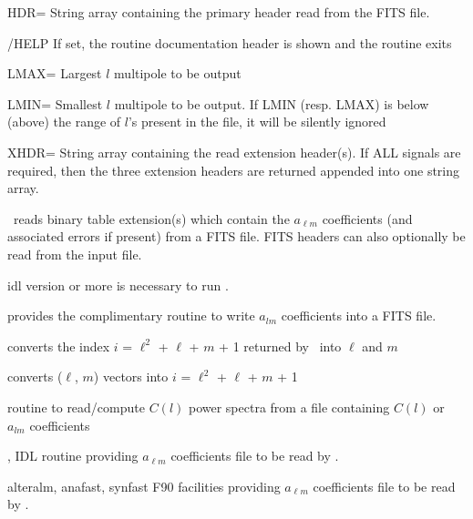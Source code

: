 \begin{keywords}
  \begin{kwlist}{} %
    \item[HDR=] String array containing the primary header read from the FITS
      file. 
    \item[/HELP] If set, the routine documentation header is shown and the routine exits	
    \item[LMAX=] Largest $l$ multipole  to be output
    \item[LMIN=] Smallest $l$ multipole to be output. If LMIN (resp. LMAX) is below (above) the range of $l$'s present in the file,
              it will be silently ignored
    \item[XHDR=] String array containing the read extension header(s). If
                  ALL signals are required, then the three extension 
                  headers are returned appended into one string array.
  \end{kwlist}
\end{keywords}  

\begin{codedescription}
{\thedocid\ reads binary table extension(s) 
which contain the $a_{\ell m}$ coefficients (and associated errors if present)
from a FITS file. FITS headers can also optionally be read from the 
input file. 
}
\end{codedescription}



\begin{related}
  \begin{sulist}{} %
    \item[idl] version \idlversion or more is necessary to run \thedocid.
    \item[\htmlref{alm2fits}{idl:alm2fits}] provides the complimentary routine to write
      $a_{lm}$ coefficients into a FITS file.
    \item[\htmlref{index2lm}{idl:index2lm}] converts the index $i$ = $\ell^2$ +
    $\ell$ + $m$ + 1 returned by \thedocid\ into $\ell$ and $m$
    \item[\htmlref{lm2index}{idl:lm2index}] converts ($\ell$, $m$) vectors into $i$ = $\ell^2$ +
    $\ell$ + $m$ + 1
    \item[\htmlref{fits2cl}{idl:fits2cl}] routine to read/compute $C(l)$ power spectra from a file containing $C(l)$ or $a_{lm}$ coefficients
    \item[\htmlref{ianafast}{idl:ianafast}, \htmlref{isynfast}{idl:isynfast}]
IDL routine providing $a_{\ell m}$ coefficients file to be read by \thedocid.
    \item[alteralm, anafast, synfast] F90 facilities providing $a_{\ell m}$ coefficients file to be read by \thedocid.
  \end{sulist}
\end{related}

